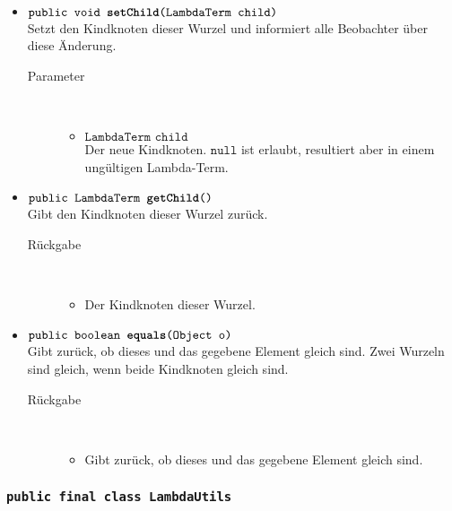 \begin{description}
\begin{itemize}
		\item $\texttt{public void \textbf{setChild}(LambdaTerm child)}$ \\ Setzt den  Kindknoten dieser Wurzel und informiert alle Beobachter über diese Änderung.
		\begin{description}
			\item[Parameter] \hfill \\
			\vspace{-.8cm}
			\begin{itemize}
				\item $\texttt{LambdaTerm child}$ \\ Der neue Kindknoten. $\texttt{null}$ ist erlaubt, resultiert aber in einem ungültigen Lambda-Term.
			\end{itemize}
		\end{description}
		
		\item $\texttt{public LambdaTerm \textbf{getChild}()}$ \\ Gibt den Kindknoten dieser Wurzel zurück.
		\begin{description}
			\item[Rückgabe] \hfill \\
			\vspace{-.8cm}
			\begin{itemize}
				\item  Der Kindknoten dieser Wurzel.
			\end{itemize}
		\end{description}
		
		\item $\texttt{public boolean \textbf{equals}(Object o)}$ \\ Gibt zurück, ob dieses und das gegebene Element gleich sind. Zwei Wurzeln sind gleich, wenn beide Kindknoten gleich sind.
		\begin{description}
			\item[Rückgabe] \hfill \\
			\vspace{-.8cm}
			\begin{itemize}
				\item Gibt zurück, ob dieses und das gegebene Element gleich sind.
			\end{itemize}
		\end{description}
	\end{itemize}
\end{description}

\subsubsection{\normalfont \texttt{public final class \textbf{LambdaUtils}}}

